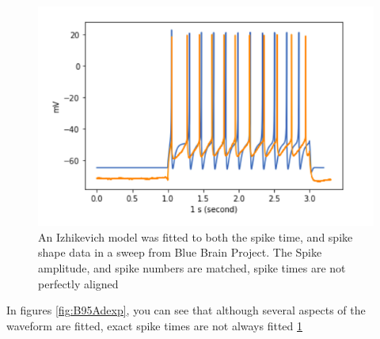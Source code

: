\begin{figure}
    \centering
    \includegraphics{figures/IZHI_B95.png}
    \caption{An Izhikevich model was fitted to both the spike time, and spike shape data in a sweep from Blue Brain Project. The Spike amplitude, and spike numbers are matched, spike times are not perfectly aligned}
    \label{fig:B95_IZHI}
\end{figure}

In figures \ref{fig:B95Adexp}, you can see that although several aspects of the waveform are fitted, exact spike times are not always fitted \ref{fig:B95_IZHI}

